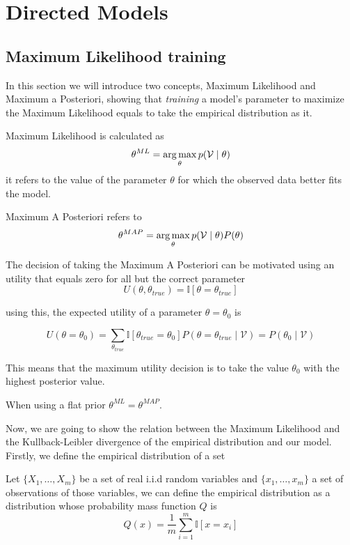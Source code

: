 \section{Directed Models}
\subsection{Maximum Likelihood training}

In this section we will introduce two concepts, Maximum Likelihood and Maximum a
Posteriori, showing that \emph{training} a model's parameter to maximize the
Maximum Likelihood equals to take the empirical distribution as it.

\begin{definition}
  Maximum Likelihood is calculated as
  \[
    \theta^{ML} = \operatorname*{arg\,max}_\theta p(\mathcal{V} \mid \theta)
  \]
   it refers to the value of the parameter
\(\theta\) for which the observed data better fits the model.
\end{definition}

\begin{definition}
  Maximum A Posteriori refers to
  \[
    \theta^{MAP} = \operatorname*{arg\,max}_\theta p(\mathcal{V} \mid \theta)P(\theta)
  \]
\end{definition}

The decision of taking the Maximum A Posteriori can be motivated using an
utility that equals zero for all but the correct parameter
\[
  U(\theta, \theta_{true}) = \mathbb{I}[\theta = \theta_{true}]
\]

using this, the expected utility of a parameter \(\theta = \theta_0\) is

\[
  U(\theta = \theta_0) = \sum_{\theta_{true}}\mathbb{I}[\theta_{true} = \theta_0]P(\theta = \theta_{true}  \mid  \mathcal{V}) = P(\theta_0  \mid  \mathcal{V})
\]

This means that the maximum utility decision is to take the value \(\theta_0\)
with the highest posterior value.

\begin{remark}
When using a flat prior \(\theta^{ML}= \theta ^{MAP}\).
\end{remark}



Now, we are going to show the relation between the Maximum Likelihood and the
Kullback-Leibler divergence of the empirical distribution and our model.
Firstly, we define the empirical distribution of a set

Let \(\{X_1, \dots, X_m\}\) be a set of real i.i.d random variables and
\(\{x_{1}, \dots, x_{m}\}\) a set of observations of those variables, we can define the
empirical distribution as a distribution whose probability mass function
\(Q\) is
\[
  Q(x) = \frac{1}{m}\sum_{i = 1}^m \mathbb{I}[x = x_i]
\]

